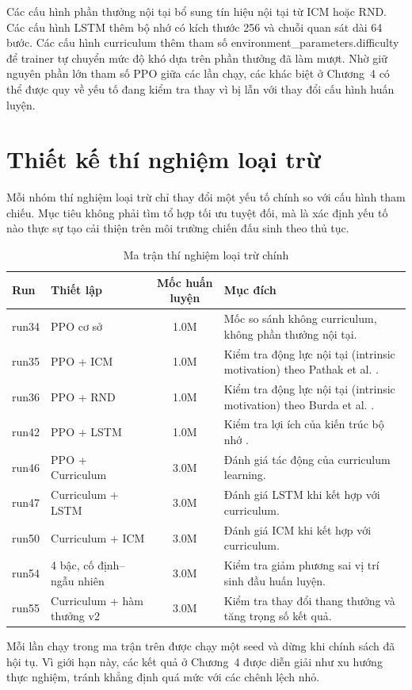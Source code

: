 Các cấu hình phần thưởng nội tại bổ sung tín hiệu nội tại từ ICM hoặc RND. Các cấu hình LSTM thêm bộ nhớ có kích thước 256 và chuỗi quan sát dài 64 bước. Các cấu hình curriculum thêm tham số {environment\_parameters.difficulty} để trainer tự chuyển mức độ khó dựa trên phần thưởng đã làm mượt. Nhờ giữ nguyên phần lớn tham số PPO giữa các lần chạy, các khác biệt ở Chương~4 có thể được quy về yếu tố đang kiểm tra thay vì bị lẫn với thay đổi cấu hình huấn luyện.

\section{Thiết kế thí nghiệm loại trừ}

Mỗi nhóm thí nghiệm loại trừ chỉ thay đổi một yếu tố chính so với cấu hình tham chiếu. Mục tiêu không phải tìm tổ hợp tối ưu tuyệt đối, mà là xác định yếu tố nào thực sự tạo cải thiện trên môi trường chiến đấu sinh theo thủ tục.

\begin{table}[H]
    \centering
    \small
    \caption{Ma trận thí nghiệm loại trừ chính}
    \label{tab:ablation_matrix_design}
    \begin{tabular}{|p{2cm}|p{5.1cm}|c|p{5.2cm}|}
        \hline
        \textbf{Run} & \textbf{Thiết lập} & \textbf{Mốc huấn luyện} & \textbf{Mục đích} \\
        \hline
        run34 & PPO cơ sở & 1.0M & Mốc so sánh không curriculum, không phần thưởng nội tại. \\
        \hline
        run35 & PPO + ICM & 1.0M & Kiểm tra động lực nội tại (intrinsic motivation) theo Pathak et al. \cite{Pathak2017}. \\
        \hline
        run36 & PPO + RND & 1.0M & Kiểm tra động lực nội tại (intrinsic motivation) theo Burda et al. \cite{Burda2018}. \\
        \hline
        run42 & PPO + LSTM & 1.0M & Kiểm tra lợi ích của kiến trúc bộ nhớ \cite{Hochreiter1997}. \\
        \hline
        run46 & PPO + Curriculum & 3.0M & Đánh giá tác động của curriculum learning. \\
        \hline
        run47 & Curriculum + LSTM & 3.0M & Đánh giá LSTM khi kết hợp với curriculum. \\
        \hline
        run50 & Curriculum + ICM & 3.0M & Đánh giá ICM khi kết hợp với curriculum. \\
        \hline
        run54 & 4 bậc, cố định--ngẫu nhiên & 3.0M & Kiểm tra giảm phương sai vị trí sinh đầu huấn luyện. \\
        \hline
        run55 & Curriculum + hàm thưởng v2 & 3.0M & Kiểm tra thay đổi thang thưởng và tăng trọng số kết quả. \\
        \hline
    \end{tabular}
\end{table}
Mỗi lần chạy trong ma trận trên được chạy một seed và dừng khi chính sách đã hội tụ. Vì giới hạn này, các kết quả ở Chương~4 được diễn giải như xu hướng thực nghiệm, tránh khẳng định quá mức với các chênh lệch nhỏ.

